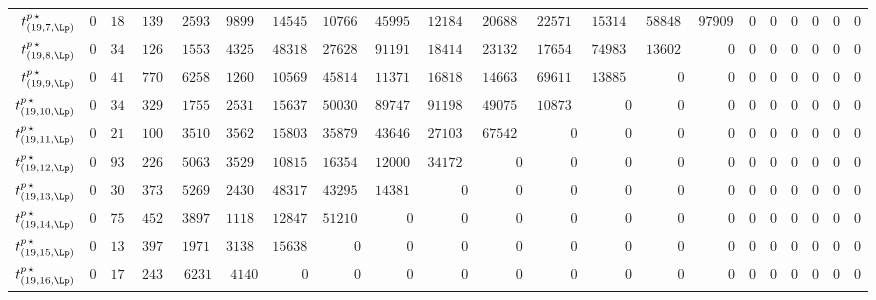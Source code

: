 \begin{tabular}{r|rrrrrrrrrrrrrrrrrrrr}
  $t^{p \, \star}_{(19,7,\Lp)}$ & $0$ & $188638$ & $1393093148$ & $259351207389$ & $9899443780204$ & $145452985167920$ & $1076688614008584$ & $4599512027560821$ & $12184024056049944$ & $20688550477231896$ & $22571771814144000$ & $15314359373691840$ & $5884845090949440$ & $979096197119040$ & $0$ & $0$ & $0$ & $0$ & $0$ & $0$ \\
  $t^{p \, \star}_{(19,8,\Lp)}$ & $0$ & $341653$ & $1262903658$ & $155374214793$ & $4325605752716$ & $48318346784395$ & $276288952557582$ & $911911624128393$ & $1841407877458248$ & $2313297515013480$ & $1765462255464960$ & $749830832063280$ & $136027738661760$ & $0$ & $0$ & $0$ & $0$ & $0$ & $0$ & $0$ \\
  $t^{p \, \star}_{(19,9,\Lp)}$ & $0$ & $414116$ & $770870072$ & $62580729435$ & $1260940940212$ & $10569843931415$ & $45814808647494$ & $113719627217861$ & $168180724527304$ & $146630953368711$ & $69611050764450$ & $13885290396450$ & $0$ & $0$ & $0$ & $0$ & $0$ & $0$ & $0$ & $0$ \\
  $t^{p \, \star}_{(19,10,\Lp)}$ & $0$ & $349703$ & $329076302$ & $17555896113$ & $253124294492$ & $1563724182875$ & $5003024630718$ & $8974777680995$ & $9119833519704$ & $4907580912873$ & $1087327768410$ & $0$ & $0$ & $0$ & $0$ & $0$ & $0$ & $0$ & $0$ & $0$ \\
  $t^{p \, \star}_{(19,11,\Lp)}$ & $0$ & $211891$ & $100908698$ & $3510412587$ & $35623205548$ & $158038997330$ & $358791079068$ & $436463311914$ & $271039700688$ & $67542128208$ & $0$ & $0$ & $0$ & $0$ & $0$ & $0$ & $0$ & $0$ & $0$ & $0$ \\
  $t^{p \, \star}_{(19,12,\Lp)}$ & $0$ & $93975$ & $22610090$ & $506340066$ & $3529149568$ & $10815754100$ & $16354033416$ & $12000741606$ & $3417214416$ & $0$ & $0$ & $0$ & $0$ & $0$ & $0$ & $0$ & $0$ & $0$ & $0$ & $0$ \\
  $t^{p \, \star}_{(19,13,\Lp)}$ & $0$ & $30846$ & $3731332$ & $52693476$ & $243002144$ & $483175145$ & $432958962$ & $143819634$ & $0$ & $0$ & $0$ & $0$ & $0$ & $0$ & $0$ & $0$ & $0$ & $0$ & $0$ & $0$ \\
  $t^{p \, \star}_{(19,14,\Lp)}$ & $0$ & $7516$ & $452612$ & $3897981$ & $11186196$ & $12847635$ & $5121090$ & $0$ & $0$ & $0$ & $0$ & $0$ & $0$ & $0$ & $0$ & $0$ & $0$ & $0$ & $0$ & $0$ \\
  $t^{p \, \star}_{(19,15,\Lp)}$ & $0$ & $1350$ & $39740$ & $197121$ & $313852$ & $156380$ & $0$ & $0$ & $0$ & $0$ & $0$ & $0$ & $0$ & $0$ & $0$ & $0$ & $0$ & $0$ & $0$ & $0$ \\
  $t^{p \, \star}_{(19,16,\Lp)}$ & $0$ & $176$ & $2436$ & $6231$ & $4140$ & $0$ & $0$ & $0$ & $0$ & $0$ & $0$ & $0$ & $0$ & $0$ & $0$ & $0$ & $0$ & $0$ & $0$ & $0$ \\

\end{tabular}
